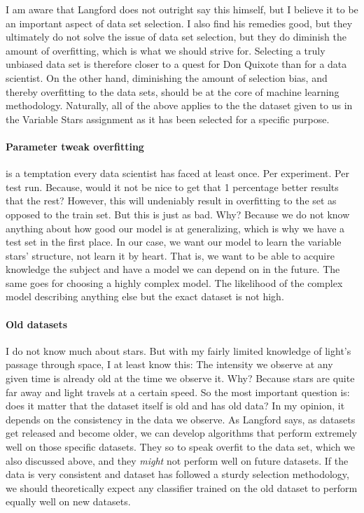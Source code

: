 \documentclass{article}
\theoremstyle{plain}
\theoremstyle{nonumberplain}
\begin{document}
I am aware that Langford does not outright say this himself, but I believe it to be an important aspect of data set selection.
I also find his remedies good, but they ultimately do not solve the issue of data set selection, but they do diminish the amount of overfitting, which is what we should strive for.
Selecting a truly unbiased data set is therefore closer to a quest for Don Quixote than for a data scientist. 
On the other hand, diminishing the amount of selection bias, and thereby overfitting to the data sets, should be at the core of machine learning methodology.
Naturally, all of the above applies to the the dataset given to us in the Variable Stars assignment as it has been selected for a specific purpose. 

\paragraph{Parameter tweak overfitting} is a temptation every data scientist has faced at least once.
Per experiment.
Per test run.
Because, would it not be nice to get that 1 percentage better results that the rest?
However, this will undeniably result in overfitting to the  set as opposed to the train set. 
But this is just as bad.
Why? Because we do not know anything about how good our model is at generalizing, which is why we have a test set in the first place.
In our case, we want our model to learn the variable stars' structure, not learn it by heart.
That is, we want to be able to acquire knowledge the subject and have a model we can depend on in the future. 
The same goes for choosing a highly complex model.
The likelihood of the complex model describing anything else but the exact dataset is not high.


\paragraph{Old datasets} I do not know much about stars. 
But with my fairly limited knowledge of light's passage through space, I at least know this: The intensity we observe at any given time is already old at the time we observe it.
Why? Because stars are quite far away and light travels at a certain speed.
So the most important question is: does it matter that the dataset itself is old and has old data?
In my opinion, it depends on the consistency in the data we observe.
As Langford says, as datasets get released and become older, we can develop algorithms that perform extremely well on those specific datasets.
They so to speak overfit to the data set, which we also discussed above, and they \textit{might} not perform well on future datasets. 
If the data is very consistent and dataset has followed a sturdy selection methodology, we should theoretically expect any classifier trained on the old dataset to perform equally well on new datasets.
\end{document}
